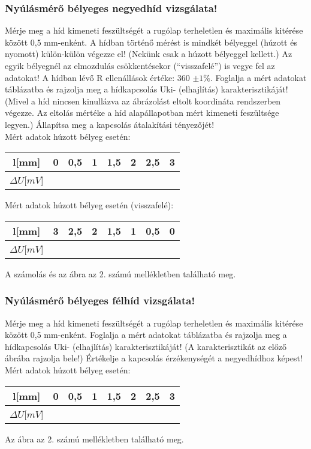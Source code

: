 \documentclass[10pt,a4paper]{article}
\begin{document}
	\subsubsection{Nyúlásmérő bélyeges negyedhíd vizsgálata!}
	Mérje meg a híd kimeneti feszültségét a rugólap terheletlen és maximális kitérése között 0,5 mm-enként. A hídban történő mérést is mindkét bélyeggel (húzott és nyomott) külön-külön végezze el! (Nekünk csak a húzott bélyeggel kellett.)
Az egyik bélyegnél az elmozdulás csökkentésekor (“visszafelé”) is vegye fel az adatokat!
A hídban lévő R ellenállások értéke: 360 $\pm 1\%$.
Foglalja a mért adatokat táblázatba és rajzolja meg a hídkapcsolás Uki-
(elhajlítás) karakterisztikáját! (Mivel a híd nincsen kinullázva az
ábrázolást eltolt koordináta rendszerben végezze. Az eltolás mértéke a híd
alapállapotban mért kimeneti feszültsége legyen.)
Állapítsa meg a kapcsolás átalakítási tényezőjét!$$$$
Mért adatok húzott bélyeg esetén:$$$$
\begin{tabular}{|c|c|c|c|c|c|c|c|}
\hline 
l[mm] & 0 & 0,5 & 1 & 1,5 & 2 & 2,5 & 3 \\ 
\hline 
$\Delta U$[$mV$] &  & &  &  &  &  &  \\ 
\hline 
\end{tabular} $$$$
Mért adatok húzott bélyeg esetén (visszafelé):$$$$
\begin{tabular}{|c|c|c|c|c|c|c|c|}
\hline 
l[mm] & 3 & 2,5 & 2 & 1,5 & 1 & 0,5 & 0 \\ 
\hline 
$\Delta U$[$mV$] &  &  &  &  &  &  &  \\ 
\hline 
\end{tabular} $$$$
A számolás és az ábra az 2. számú mellékletben található meg.
	\subsubsection{Nyúlásmérő bélyeges félhíd vizsgálata!}
	Mérje meg a híd kimeneti feszültségét a rugólap terheletlen és maximális kitérése között 0,5 mm-enként. Foglalja a mért adatokat táblázatba és rajzolja meg a hídkapcsolás Uki- (elhajlítás) karakterisztikáját! (A karakterisztikát az előző ábrába rajzolja bele!)
Értékelje a kapcsolás érzékenységét a negyedhídhoz képest!
$$$$
Mért adatok húzott bélyeg esetén:$$$$
\begin{tabular}{|c|c|c|c|c|c|c|c|}
\hline 
l[mm] & 0 & 0,5 & 1 & 1,5 & 2 & 2,5 & 3 \\ 
\hline 
$\Delta U$[$mV$] &  &  &  &  &  &  &  \\ 
\hline 
\end{tabular} $$$$ Az ábra az 2. számú mellékletben található meg.
\end{document}
